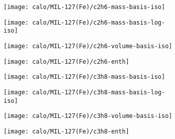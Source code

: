 \begin{figure}[H]

    \begin{subfigure}{0.25\textwidth}
        \texttt{[image: calo/MIL-127(Fe)/c2h6-mass-basis-iso]}%
        \label{appx:fig:shaping:mil127c2h6mass}
    \end{subfigure}%
    \begin{subfigure}{0.25\textwidth}
        \texttt{[image: calo/MIL-127(Fe)/c2h6-mass-basis-log-iso]}%
        \label{appx:fig:shaping:mil127c2h6masslog}
    \end{subfigure}%
    \begin{subfigure}{0.25\textwidth}
        \texttt{[image: calo/MIL-127(Fe)/c2h6-volume-basis-iso]}%
        \label{appx:fig:shaping:mil127c2h6volume}
    \end{subfigure}%
    \begin{subfigure}{0.25\textwidth}
        \texttt{[image: calo/MIL-127(Fe)/c2h6-enth]}%
        \label{appx:fig:shaping:mil127c2h6enth}
    \end{subfigure}%

    \begin{subfigure}{0.25\textwidth}
        \texttt{[image: calo/MIL-127(Fe)/c3h8-mass-basis-iso]}%
        \label{appx:fig:shaping:mil127c3h8mass}
    \end{subfigure}%
    \begin{subfigure}{0.25\textwidth}
        \texttt{[image: calo/MIL-127(Fe)/c3h8-mass-basis-log-iso]}%
        \label{appx:fig:shaping:mil127c3h8masslog}
    \end{subfigure}%
    \begin{subfigure}{0.25\textwidth}
        \texttt{[image: calo/MIL-127(Fe)/c3h8-volume-basis-iso]}%
        \label{appx:fig:shaping:mil127c3h8volume}
    \end{subfigure}%
    \begin{subfigure}{0.25\textwidth}
        \texttt{[image: calo/MIL-127(Fe)/c3h8-enth]}%
        \label{appx:fig:shaping:mil127c3h8enth}
    \end{subfigure}%


\end{figure}
